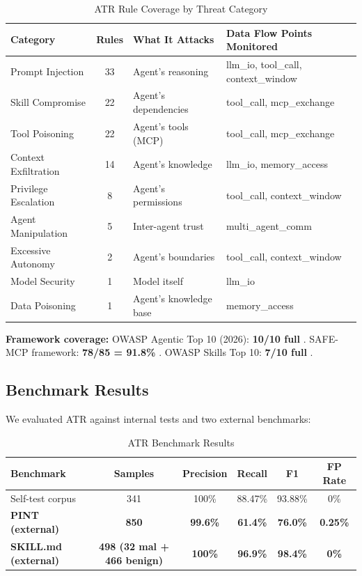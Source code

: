 \documentclass[11pt,letterpaper]{article}
\begin{document}
\begin{table}[htbp]
\centering
\caption{ATR Rule Coverage by Threat Category}
\label{tab:coverage}
\footnotesize
\begin{tabularx}{\textwidth}{lclX}
\toprule
\textbf{Category} & \textbf{Rules} & \textbf{What It Attacks} & \textbf{Data Flow Points Monitored} \\
\midrule
Prompt Injection & 33 & Agent's reasoning & llm\_io, tool\_call, context\_window \\
Skill Compromise & 22 & Agent's dependencies & tool\_call, mcp\_exchange \\
Tool Poisoning & 22 & Agent's tools (MCP) & tool\_call, mcp\_exchange \\
Context Exfiltration & 14 & Agent's knowledge & llm\_io, memory\_access \\
Privilege Escalation & 8 & Agent's permissions & tool\_call, context\_window \\
Agent Manipulation & 5 & Inter-agent trust & multi\_agent\_comm \\
Excessive Autonomy & 2 & Agent's boundaries & tool\_call, context\_window \\
Model Security & 1 & Model itself & llm\_io \\
Data Poisoning & 1 & Agent's knowledge base & memory\_access \\
\bottomrule
\end{tabularx}
\end{table}

\textbf{Framework coverage:} OWASP Agentic Top 10 (2026): \textbf{10/10 full} \cite{owaspagentic}. SAFE-MCP framework: \textbf{78/85 = 91.8\%} \cite{safemcp}. OWASP Skills Top 10: \textbf{7/10 full} \cite{owaspllm}.


\subsection{Benchmark Results}

We evaluated ATR against internal tests and two external benchmarks:

\begin{table}[htbp]
\centering
\caption{ATR Benchmark Results}
\label{tab:benchresults}
\begin{tabular}{lccccc}
\toprule
\textbf{Benchmark} & \textbf{Samples} & \textbf{Precision} & \textbf{Recall} & \textbf{F1} & \textbf{FP Rate} \\
\midrule
Self-test corpus & 341 & 100\% & 88.47\% & 93.88\% & 0\% \\
\textbf{PINT (external)} & \textbf{850} & \textbf{99.6\%} & \textbf{61.4\%} & \textbf{76.0\%} & \textbf{0.25\%} \\
\textbf{SKILL.md (external)} & \textbf{498 (32 mal + 466 benign)} & \textbf{100\%} & \textbf{96.9\%} & \textbf{98.4\%} & \textbf{0\%} \\
\bottomrule
\end{tabular}
\end{table}
\end{document}
